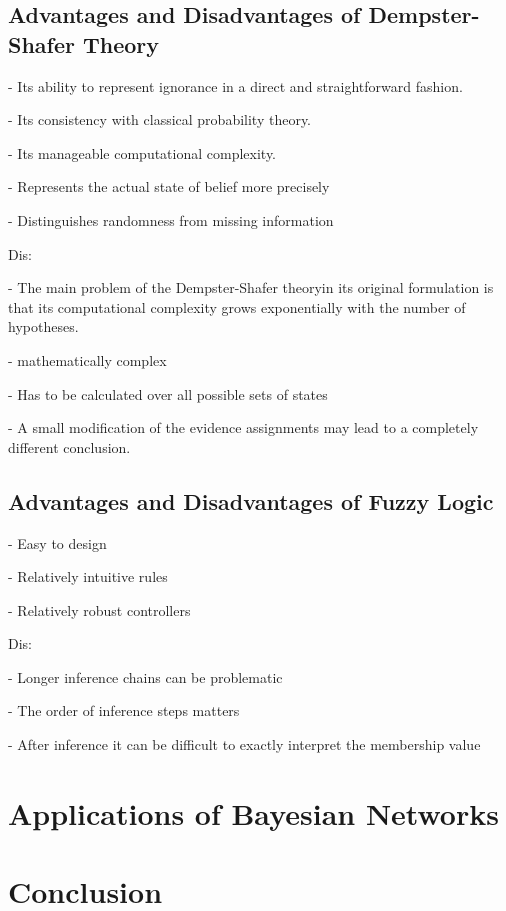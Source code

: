 \documentclass[11pt]{article}
\begin{document}
\subsection{Advantages and Disadvantages of Dempster-Shafer Theory}

- Its ability to represent ignorance in a direct and straightforward fashion.

- Its consistency with classical probability theory.

- Its manageable computational complexity.

- Represents the actual state of belief more precisely

- Distinguishes randomness from missing information

Dis:

- The main problem of the Dempster-Shafer theoryin its original formulation is
that its computational complexity grows exponentially with the number of
hypotheses.

- mathematically complex

- Has to be calculated over all possible sets of states

- A small modification of the evidence assignments may lead to a completely
different conclusion.

\subsection{Advantages and Disadvantages of Fuzzy Logic}

- Easy to design 

- Relatively intuitive rules 

- Relatively robust controllers 

Dis:

- Longer inference chains can be problematic 

- The order of inference steps matters

- After inference it can be difficult to exactly interpret the membership value 


\section{Applications of Bayesian Networks}

\section{Conclusion}



\end{document}
